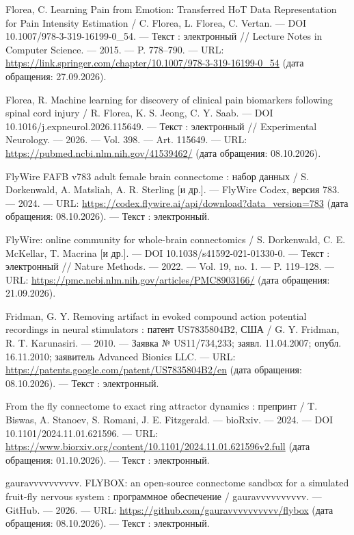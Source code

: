 \begin{list}{}{\setlength{\leftmargin}{10mm}\setlength{\labelwidth}{8mm}\setlength{\labelsep}{2mm}\setlength{\itemsep}{0pt}\setlength{\parsep}{0pt}\setlength{\topsep}{0pt}}
\item[130.] Florea, C. Learning Pain from Emotion: Transferred HoT Data Representation for Pain Intensity Estimation / C. Florea, L. Florea, C. Vertan. — DOI 10.1007/978-3-319-16199-0\_54. — Текст : электронный // Lecture Notes in Computer Science. — 2015. — P. 778–790. — URL: \url{https://link.springer.com/chapter/10.1007/978-3-319-16199-0\_54} (дата обращения: 27.09.2026).
\item[131.] Florea, R. Machine learning for discovery of clinical pain biomarkers following spinal cord injury / R. Florea, K. S. Jeong, C. Y. Saab. — DOI 10.1016/j.expneurol.2026.115649. — Текст : электронный // Experimental Neurology. — 2026. — Vol. 398. — Art. 115649. — URL: \url{https://pubmed.ncbi.nlm.nih.gov/41539462/} (дата обращения: 08.10.2026).
\item[132.] FlyWire FAFB v783 adult female brain connectome : набор данных / S. Dorkenwald, A. Matsliah, A. R. Sterling [и др.]. — FlyWire Codex, версия 783. — 2024. — URL: \url{https://codex.flywire.ai/api/download?data\_version=783} (дата обращения: 08.10.2026). — Текст : электронный.
\item[133.] FlyWire: online community for whole-brain connectomics / S. Dorkenwald, C. E. McKellar, T. Macrina [и др.]. — DOI 10.1038/s41592-021-01330-0. — Текст : электронный // Nature Methods. — 2022. — Vol. 19, no. 1. — P. 119–128. — URL: \url{https://pmc.ncbi.nlm.nih.gov/articles/PMC8903166/} (дата обращения: 21.09.2026).
\item[134.] Fridman, G. Y. Removing artifact in evoked compound action potential recordings in neural stimulators : патент US7835804B2, США / G. Y. Fridman, R. T. Karunasiri. — 2010. — Заявка № US11/734,233; заявл. 11.04.2007; опубл. 16.11.2010; заявитель Advanced Bionics LLC. — URL: \url{https://patents.google.com/patent/US7835804B2/en} (дата обращения: 08.10.2026). — Текст : электронный.
\item[135.] From the fly connectome to exact ring attractor dynamics : препринт / T. Biswas, A. Stanoev, S. Romani, J. E. Fitzgerald. — bioRxiv. — 2024. — DOI 10.1101/2024.11.01.621596. — URL: \url{https://www.biorxiv.org/content/10.1101/2024.11.01.621596v2.full} (дата обращения: 01.10.2026). — Текст : электронный.
\item[136.] gauravvvvvvvvvv. FLYBOX: an open-source connectome sandbox for a simulated fruit-fly nervous system : программное обеспечение / gauravvvvvvvvvv. — GitHub. — 2026. — URL: \url{https://github.com/gauravvvvvvvvvv/flybox} (дата обращения: 08.10.2026). — Текст : электронный.

\end{list}
